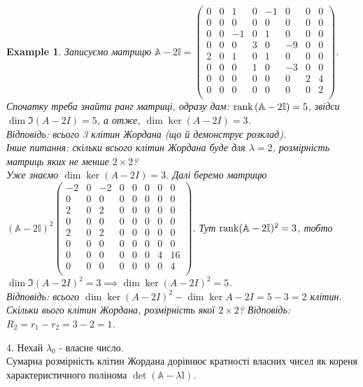 \documentclass[a4paper, 10pt]{article}
\theoremstyle{theoremdd}
\newtheorem{example}[theorem]{Example}
\begin{document}
\begin{example}
Записуємо матрицю $\mathbb{A}-2 \mathbb{I} = \begin{pmatrix}
0 & 0 & 1 & 0 & -1 & 0 & 0 & 0 \\
0 & 0 & 0 & 0 & 0 & 0 & 0 & 0 \\
0 & 0 & -1 & 0 & 1 & 0 & 0 & 0 \\
0 & 0 & 0 & 3 & 0 & -9 & 0 & 0 \\
2 & 0 & 1 & 0 & 1 & 0 & 0 & 0 \\
0 & 0 & 0 & 1 & 0 & -3 & 0 & 0 \\
0 & 0 & 0 & 0 & 0 & 0 & 2 & 4 \\
0 & 0 & 0 & 0 & 0 & 0 & 0 & 2 \\
\end{pmatrix}$.\\
Спочатку треба знайти ранг матриці, одразу дам: $\rank \left(\mathbb{A}-2 \mathbb{I} \right) = 5$, звідси $\dim \Im (A-2I) = 5$, а отже, $\dim \ker (A-2I) = 3$.\\
Відповідь: всього 3 клітин Жордана (що й демонструє розклад).\\
Інше питання: скільки всього клітин Жордана буде для $\lambda = 2$, розмірність матриць яких не менше $2 \times 2$?\\
Уже знаємо $\dim \ker (A-2I) = 3$. Далі беремо матрицю $(\mathbb{A} - 2 \mathbb{I})^2 \begin{pmatrix}
-2 & 0 & -2 & 0 & 0 & 0 & 0 & 0 \\
0 & 0 & 0 & 0 & 0 & 0 & 0 & 0 \\
2 & 0 & 2 & 0 & 0 & 0 & 0 & 0 \\
0 & 0 & 0 & 0 & 0 & 0 & 0 & 0 \\
2 & 0 & 2 & 0 & 0 & 0 & 0 & 0 \\
0 & 0 & 0 & 0 & 0 & 0 & 0 & 0 \\
0 & 0 & 0 & 0 & 0 & 0 & 4 & 16 \\
0 & 0 & 0 & 0 & 0 & 0 & 0 & 4 \\
\end{pmatrix}$. Тут $\rank (\mathbb{A}-2 \mathbb{I})^2 = 3$, тобто $\dim \Im (A-2 I)^2 = 3 \implies \dim \ker (A-2I)^2 = 5$.\\
Відповідь: всього $\dim \ker (A-2I)^2 - \dim \ker A-2I = 5 - 3 = 2$ клітин.\\
Скільки вього клітин Жордана, розмірність якої $2 \times 2$? Відповідь: $R_2 = r_1 - r_2 = 3 - 2 = 1$.
\end{example}

4. Нехай $\lambda_0$ - власне число.\\
Сумарна розмірність клітин Жордана дорівнює кратності власних чисел як кореня характеристичного полінома $\det (\mathbb{A} - \lambda \mathbb{I})$.
\end{document}
